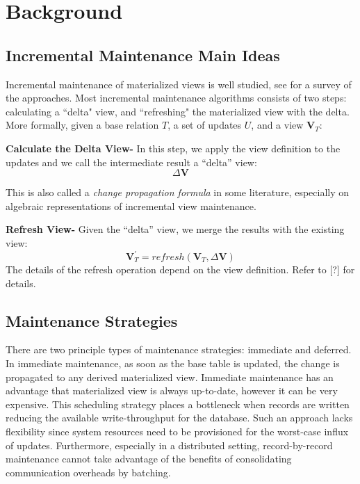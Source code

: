 \section{Background}\label{sec-background}

\subsection{Incremental Maintenance Main Ideas}
Incremental maintenance of materialized views is well studied, see \cite{chirkova2011materialized} for a survey of the approaches. 
Most incremental maintenance algorithms consists of two steps: calculating a ``delta" view,
and ``refreshing" the materialized view with the delta.
More formally, given a base relation $T$, a set of updates $U$,
and a view $\textbf{V}_{T}$:

\textbf{Calculate the Delta View- }
In this step, we apply the view definition to the updates and we call
the intermediate result a ``delta'' view:
\[
\Delta\textbf{V}
\]

This is also called a \emph{change propagation formula} in some literature,
especially on algebraic representations of incremental view maintenance.

\textbf{Refresh View- }
Given the ``delta'' view, we merge the results with the existing
view:
\[
\textbf{V}_{T}^{'}=refresh(\textbf{V}_{T},\Delta\textbf{V})
\] 
The details of the refresh operation depend on the view definition.
Refer to [?] for details.


\subsection{Maintenance Strategies}
There are two principle types of maintenance strategies: immediate and deferred. 
In immediate maintenance, as soon as the base table is updated, 
the change is propagated to any derived materialized view.
Immediate maintenance has an advantage that materialized view is always up-to-date, 
however it can be very expensive.
This scheduling strategy places a bottleneck when records are written reducing 
the available write-throughput for the database.
Such an approach lacks flexibility since system resources need to be provisioned 
for the worst-case influx of updates.
Furthermore, especially in a distributed setting, record-by-record 
maintenance cannot take advantage of the benefits of consolidating communication overheads by batching.

